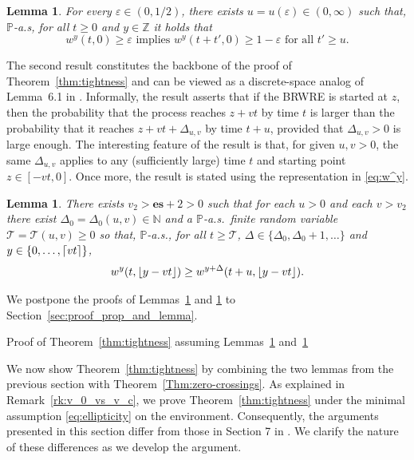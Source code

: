\documentclass[12pt,reqno,oneside]{amsart}
\makeatletter
\numberwithin{equation}{section}
\renewcommand\subsection{\@startsection{subsection}{2}%
  \z@{-.5\linespacing\@plus-.7\linespacing}{.5\linespacing}%
  {\normalfont\scshape}}
\newtheorem{lemma}[theorem]{Lemma}
\theoremstyle{definition}
\theoremstyle{remark}
\newcommand{\N}{\mathbb{N}}
\newcommand{\Z}{\mathbb{Z}}
\newcommand{\PP}{\mathbb{P}}
\newcommand{\es}{\mathbf{es}}
\DeclarePairedDelimiter{\ceil}{\lceil}{\rceil}
\DeclarePairedDelimiter{\floor}{\lfloor}{\rfloor}
\makeatother
\begin{document}
\begin{lemma}
  \label{lemma:wave_time}
  For every $\varepsilon \in (0,1/2)$, there exists
  $u = u(\varepsilon) \in (0,\infty)$ such that, $\PP$-a.s, for
  all $t\geq0$ and $y \in \Z$ it holds that
  \begin{equation}
    \label{eq:lemma_wave_time}
    w^y(t,0)\geq \varepsilon \text{ implies }
    w^y(t+t',0) \geq 1- \varepsilon \text{ for all } t' \geq u.
  \end{equation}
\end{lemma}

The second result constitutes the backbone of the proof of
Theorem~\ref{thm:tightness} and can be viewed as a discrete-space analog of
Lemma~6.1 in \cite{CDO25}. Informally, the result asserts that if the BRWRE
is started at $z$, then the probability that the process reaches
$z +vt$ by time $t$ is larger than the probability that it reaches
$z+vt+ \Delta_{u,v}$ by time $t+u$, provided that $\Delta_{u,v}>0$ is large
enough. The interesting feature of the result is that, for given $u,v>0$, the
same $\Delta_{u,v}$ applies to any (sufficiently large) time $t$ and starting
point $z \in [-vt,0]$.
Once more, the result is stated using the
representation in \eqref{eq:w^y}.

\begin{lemma}
  \label{lemma:wave}
  There exists $v_2>\es+2>0$ such that for each $u>0$ and each $v>v_2$ there
  exist $\Delta_0=\Delta_0(u,v) \in \N$ and a $\PP$-a.s.~finite random
  variable $\mathcal{T}=\mathcal{T}(u,v) \geq 0$ so that, $\PP$-a.s., for all
  $t \geq \mathcal{T}$, $\Delta\in \{\Delta_0 ,\Delta_0+1,\dots\}$ and
  $y \in \{0,\dots,\ceil{vt}\}$,
  \begin{equation*}
    w^y(t,\floor{y-vt} ) \geq w^{y+\Delta}(t+u,\floor{y-vt}).
  \end{equation*}
\end{lemma}
We postpone the proofs of Lemmas~\ref{lemma:wave_time} and \ref{lemma:wave}
to Section~\ref{sec:proof_prop_and_lemma}.

\subsection{Proof of Theorem~\ref{thm:tightness} assuming
  Lemmas~\ref{lemma:wave_time} and~\ref{lemma:wave}}
\label{sec:proof_tightness}

We now show Theorem~\ref{thm:tightness} by combining the two lemmas from the
previous section with Theorem~\ref{Thm:zero-crossings}. As explained in
Remark~\ref{rk:v_0_vs_v_c}, we prove Theorem~\ref{thm:tightness} under the
minimal assumption \eqref{eq:ellipticity} on the environment. Consequently,
the arguments presented in this section differ from those in Section 7 in
\cite{CDO25}. We clarify the nature of these differences as we develop the
argument.
\end{document}
